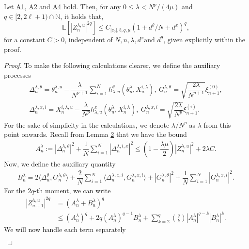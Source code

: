 \documentclass[10pt,a4paper]{amsart}
\begin{document}
\noindent \begin{lemma}\hypertarget{lemma2}{}\label{lemma2} Let \hyperlink{Assum1}{A1}, \hyperlink{Assum2}{A2} and \hyperlink{Assum4}{A4} hold. Then, for any $0\leq\lambda<N^p/(4\mu)$ and $q\in[2,2\ell+1)\cap\mathbb{N}$, it holds that,
$$\mathbb{E}\left[|Z^{\lambda,u}_{n}|^{2q}\right]\leq C_{|z_0|,b,q,\mu}(1+d^{\theta}/N+d^x)^q,$$
for a constant $C>0$, independent of $N,n,\lambda, d^x \text{and } d^{\theta}$, given explicitly within the proof.\end{lemma}

\begin{proof}
To make the following calculations clearer, we define the auxiliary processes
\begin{gather*}
\Delta_n^{\lambda,\theta}=\theta_{n}^{\lambda,u}-\dfrac{\lambda}{N^{p+1}}\sum_{i=1}^N h^{\theta}_{\lambda,u}\left(\theta_n^{\lambda},X^{i,\lambda}_n\right), \ G_n^{\lambda,\theta}=\sqrt{\dfrac{2\lambda}{N^{p+1}}}\xi^{(0)}_{n+1},\\
\Delta_n^{\lambda,x,i}=X_{n}^{i,\lambda,u}-\dfrac{\lambda}{N^p} h^{x}_{\lambda,u}\left(\theta_n^{\lambda},X^{i,\lambda}_n\right), \ G_n^{\lambda,x,i}=\sqrt{\dfrac{2\lambda}{N^p}}\xi^{(i)}_{n+1}.
\end{gather*}
For the sake of simplicity in the calculations, we denote $\lambda/N^p$ as $\lambda$ from this point onwards. Recall from Lemma \hyperlink{lemma1}{2} that we have the bound
\begin{gather*}
A_n^{\lambda}:=|\Delta_n^{\lambda,\theta}|^2+\dfrac{1}{N}\sum_{i=1}^N|\Delta_n^{\lambda,i,x}|^2\leq \left(1-\dfrac{\lambda\mu}{2}\right)|Z_n^{\lambda,u}|^2+2\lambda C.
\end{gather*}
Now, we define the auxiliary quantity
\begin{gather*}
B^{\lambda}_n=2\langle \Delta_n^{\theta},G_n^{\lambda,\theta}\rangle+\dfrac{2}{N}\sum_{i=1}^N\langle \Delta_n^{\lambda,x,i},G_n^{\lambda,x,i}\rangle+|G_n^{\lambda,\theta}|^2+\dfrac{1}{N}\sum_{i=1}^N|G_n^{\lambda,x,i}|^2.
\end{gather*}
For the $2q$-th moment, we can write
\begin{align}
|Z_{n+1}^{\lambda,u}|^{2q}&=\left(A_n^{\lambda}+B^{\lambda}_n\right)^q\nonumber \\
&\leq (A_n^{\lambda})^q+2q(A_n^{\lambda})^{q-1}B^{\lambda}_n+\sum_{k=2}^q\binom{q}{k}|A_n^{\lambda}|^{q-k}|B^{\lambda}_n|^k. \label{eq:010}
\end{align}
We will now handle each term separately
\begin{align}

\end{align}
\end{proof}
\end{document}
